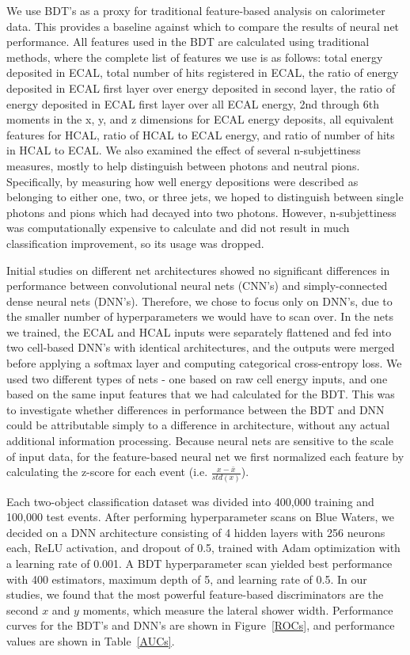 We use BDT's as a proxy for traditional feature-based analysis on calorimeter data. This provides a baseline against which to compare the results of neural net performance. All features used in the BDT are calculated using traditional methods, where the complete list of features we use is as follows: total energy deposited in ECAL, total number of hits registered in ECAL, the ratio of energy deposited in ECAL first layer over energy deposited in second layer, the ratio of energy deposited in ECAL first layer over all ECAL energy, 2nd through 6th moments in the x, y, and z dimensions for ECAL energy deposits, all equivalent features for HCAL, ratio of HCAL to ECAL energy, and ratio of number of hits in HCAL to ECAL. We also examined the effect of several n-subjettiness measures, mostly to help distinguish between photons and neutral pions. Specifically, by measuring how well energy depositions were described as belonging to either one, two, or three jets, we hoped to distinguish between single photons and pions which had decayed into two photons. However, n-subjettiness was computationally expensive to calculate and did not result in much classification improvement, so its usage was dropped.

Initial studies on different net architectures showed no significant differences in performance between convolutional neural nets (CNN's) and simply-connected dense neural nets (DNN's). Therefore, we chose to focus only on DNN's, due to the smaller number of hyperparameters we would have to scan over. In the nets we trained, the ECAL and HCAL inputs were separately flattened and fed into two cell-based DNN's with identical architectures, and the outputs were merged before applying a softmax layer and computing categorical cross-entropy loss. We used two different types of nets - one based on raw cell energy inputs, and one based on the same input features that we had calculated for the BDT. This was to investigate whether differences in performance between the BDT and DNN could be attributable simply to a difference in architecture, without any actual additional information processing. Because neural nets are sensitive to the scale of input data, for the feature-based neural net we first normalized each feature by calculating the z-score for each event (i.e. $\frac{x-\bar{x}}{std(x)}$).

Each two-object classification dataset was divided into 400,000 training and 100,000 test events. After performing hyperparameter scans on Blue Waters, we decided on a DNN architecture consisting of 4 hidden layers with 256 neurons each, ReLU activation, and dropout of 0.5, trained with Adam optimization with a learning rate of 0.001. A BDT hyperparameter scan yielded best performance with 400 estimators, maximum depth of 5, and learning rate of 0.5. In our studies, we found that the most powerful feature-based discriminators are the second $x$ and $y$ moments, which measure the lateral shower width. Performance curves for the BDT's and DNN's are shown in Figure~\ref{ROCs}, and performance values are shown in Table~\ref{AUCs}.

